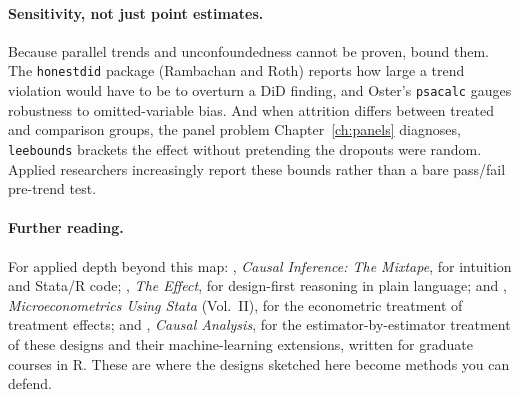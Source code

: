\paragraph{Sensitivity, not just point estimates.} Because parallel trends and unconfoundedness cannot be proven, bound them. The \texttt{honestdid} package (Rambachan and Roth) reports how large a trend violation would have to be to overturn a DiD finding, and Oster's \texttt{psacalc} gauges robustness to omitted-variable bias. And when attrition differs between treated and comparison groups, the panel problem Chapter~\ref{ch:panels} diagnoses, \texttt{leebounds} \parencite{lee2009bounds,tauchmann2014leebounds} brackets the effect without pretending the dropouts were random. Applied researchers increasingly report these bounds rather than a bare pass/fail pre-trend test.

\paragraph{Further reading.} For applied depth beyond this map: \textcite{cunningham2021mixtape}, \emph{Causal Inference: The Mixtape}, for intuition and Stata/R code; \textcite{huntingtonklein2022effect}, \emph{The Effect}, for design-first reasoning in plain language; and \textcite{cameron2022microeconometrics}, \emph{Microeconometrics Using Stata} (Vol.~II), for the econometric treatment of treatment effects; and \textcite{huber2023causal}, \emph{Causal Analysis}, for the estimator-by-estimator treatment of these designs and their machine-learning extensions, written for graduate courses in R. These are where the designs sketched here become methods you can defend.

